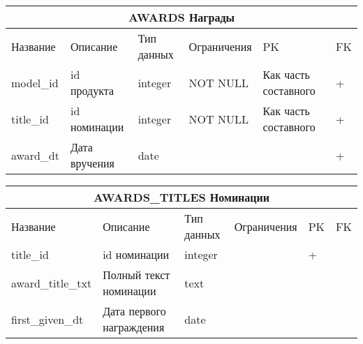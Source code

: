 \documentclass{article}
\begin{document}
\begin{tabular}{ |p{4cm}|p{4cm}|p{2.5cm}|p{3.5cm}|p{2cm}|p{1cm}| }
\hline
\multicolumn{6}{|c|}{AWARDS Награды} \\
\hline
Название & Описание & Тип данных & Ограничения & PK & FK\\
\hline
model\_id                           &   %
id продукта                         &   %
integer                             &   %
NOT NULL                            &   %
Как часть составного                &   %
 +                                  \\  %
\hline
title\_id                           &   %
id номинации                        &   %
integer                             &   %
NOT NULL                            &   %
Как часть составного                &   %
 +                                  \\  %
\hline
award\_dt                           &   %
Дата вручения                       &   %
date                                &   %
                                    &   %
                                    &   %
 +                                  \\  %
\hline
\end{tabular}

\begin{tabular}{ |p{4cm}|p{4cm}|p{2.5cm}|p{3.5cm}|p{2cm}|p{1cm}| }
\hline
\multicolumn{6}{|c|}{AWARDS\_TITLES Номинации} \\
\hline
Название & Описание & Тип данных & Ограничения & PK & FK\\
\hline
title\_id                           &   %
id номинации                        &   %
integer                             &   %
                                    &   %
 +                                  &   %
                                    \\  %
\hline
award\_title\_txt                   &   %
Полный текст номинации              &   %
text                                &   %
                                    &   %
                                    &   %
                                    \\  %
\hline
first\_given\_dt                    &   %
Дата первого награждения            &   %
date                                &   %
                                    &   %
                                    &   %
                                    \\  %
\hline
\end{tabular}
\end{document}
